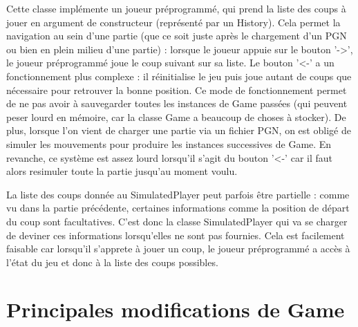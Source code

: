 \documentclass[11pt]{article}
\begin{document}
Cette classe implémente un joueur préprogrammé, qui prend la liste des coups à jouer en argument de constructeur (représenté par un History). Cela permet la navigation au sein d'une partie (que ce soit juste après le chargement d'un PGN ou bien en plein milieu d'une partie) : lorsque le joueur appuie sur le bouton '->', le joueur préprogrammé joue le coup suivant sur sa liste. Le bouton '<-' a un fonctionnement plus complexe : il réinitialise le jeu puis joue autant de coups que nécessaire pour retrouver la bonne position. Ce mode de fonctionnement permet de ne pas avoir à sauvegarder toutes les instances de Game passées (qui peuvent peser lourd en mémoire, car la classe Game a beaucoup de choses à stocker). De plus, lorsque l'on vient de charger une partie via un fichier PGN, on est obligé de simuler les mouvements pour produire les instances successives de Game. En revanche, ce système est assez lourd lorsqu'il s'agit du bouton '<-' car il faut alors resimuler toute la partie jusqu'au moment voulu.\newline

La liste des coups donnée au SimulatedPlayer peut parfois être partielle : comme vu dans la partie précédente, certaines informations comme la position de départ du coup sont facultatives. C'est donc la classe SimulatedPlayer qui va se charger de deviner ces informations lorsqu'elles ne sont pas fournies. Cela est facilement faisable car lorsqu'il s'apprete à jouer un coup, le joueur préprogrammé a accès à l'état du jeu et donc à la liste des coups possibles.

\section{Principales modifications de Game}
\end{document}
